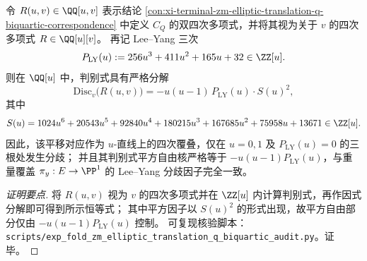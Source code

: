 \begin{conclusion}\label{con:xi-terminal-zm-elliptic-translation-q-biquartic-discriminant}
令 \(R(u,v)\in\QQ[u,v]\) 表示结论 \ref{con:xi-terminal-zm-elliptic-translation-q-biquartic-correspondence} 中定义 \(C_Q\) 的双四次多项式，并将其视为关于 \(v\) 的四次多项式 \(R\in\QQ[u][v]\)。
再记 Lee--Yang 三次
\[
P_{\mathrm{LY}}(u):=256u^{3}+411u^{2}+165u+32\in\ZZ[u].
\]
则在 \(\QQ[u]\) 中，判别式具有严格分解
\[
\mathrm{Disc}_{v}\bigl(R(u,v)\bigr)
=-u(u-1)\,P_{\mathrm{LY}}(u)\cdot S(u)^{2},
\]
其中
\[
S(u)=1024u^{6}+20543u^{5}+92840u^{4}+180215u^{3}+167685u^{2}+75958u+13671\in\ZZ[u].
\]
因此，该平移对应作为 \(u\)-直线上的四次覆叠，仅在 \(u=0,1\) 及 \(P_{\mathrm{LY}}(u)=0\) 的三根处发生分歧；
并且其判别式平方自由核严格等于 \(-u(u-1)P_{\mathrm{LY}}(u)\)，与重量覆盖 \(\pi_y:E\to\PP^{1}\) 的 Lee--Yang 分歧因子完全一致。
\end{conclusion}
\begin{proof}[证明要点]
将 \(R(u,v)\) 视为 \(v\) 的四次多项式并在 \(\ZZ[u]\) 内计算判别式，再作因式分解即可得到所示恒等式；
其中平方因子以 \(S(u)^2\) 的形式出现，故平方自由部分仅由 \(-u(u-1)P_{\mathrm{LY}}(u)\) 控制。
可复现核验脚本：\texttt{scripts/exp\_fold\_zm\_elliptic\_translation\_q\_biquartic\_audit.py}。证毕。
\end{proof}

